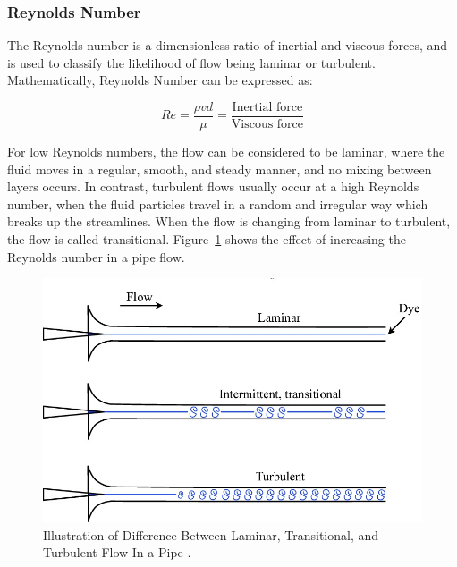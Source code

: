 \subsubsection{Reynolds Number}
The Reynolds number is a dimensionless ratio of inertial and viscous forces, and is used to classify the likelihood of flow being laminar or turbulent\cite{Rehm2008SituationalMPD}. Mathematically, Reynolds Number can be expressed as:

\begin{equation}
Re = \frac{\rho v d}{\mu} = \frac{\text{Inertial force}}{\text{Viscous force}}
\end{equation}

\noindent For low Reynolds numbers, the flow can be considered to be laminar, where the fluid moves in a regular, smooth, and steady manner, and no mixing between layers occurs\cite{Obidi2014TheoryVehicles}. In contrast, turbulent flows usually occur at a high Reynolds number, when the fluid particles travel in a random and irregular way which breaks up the streamlines. When the flow is changing from laminar to turbulent, the flow is called transitional. Figure~\ref{fig:2} shows the effect of increasing the Reynolds number in a pipe flow.

\begin{figure}[!htb]
    \centering
    \includegraphics[scale=0.4]{Figures/laminar_turbulent_difference.jpg}
    \caption{Illustration of Difference Between Laminar, Transitional, and Turbulent Flow In a Pipe \cite{D.BARKLE2016TheoreticalPipe}.}
    \label{fig:2}
\end{figure}


